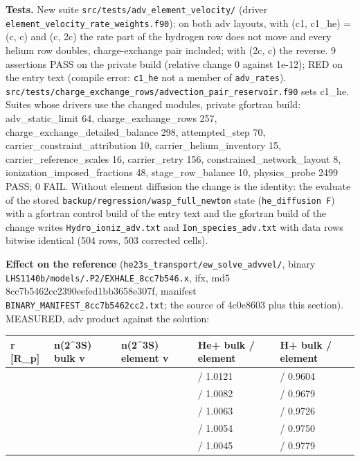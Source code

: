 \documentclass[english,a4paper]{my_memo}
\begin{document}
\textbf{Tests.} New suite \texttt{src/tests/adv\_element\_velocity/} (driver
\texttt{element\_velocity\_rate\_weights.f90}): on both adv layouts, with (c1, c1\_he) =
(c, c) and (c, 2c) the rate part of the hydrogen row does not move and every
helium row doubles, charge-exchange pair included; with (2c, c) the reverse.
9 assertions PASS on the private build (relative change 0 against 1e-12);
RED on the entry text (compile error: \texttt{c1\_he} not a member of \texttt{adv\_rates}).
\texttt{src/tests/charge\_exchange\_rows/advection\_pair\_reservoir.f90} sets c1\_he.
Suites whose drivers use the changed modules, private gfortran build:
adv\_static\_limit 64, charge\_exchange\_rows 257, charge\_exchange\_detailed\_balance
298, attempted\_step 70, carrier\_constraint\_attribution 10,
carrier\_helium\_inventory 15, carrier\_reference\_scales 16, carrier\_retry 156,
constrained\_network\_layout 8, ionization\_imposed\_fractions 48,
stage\_row\_balance 10, physics\_probe 2499 PASS; 0 FAIL.
Without element diffusion the change is the identity: the evaluate of the
stored \texttt{backup/regression/wasp\_full\_newton} state (\texttt{he\_diffusion\ F}) with a
gfortran control build of the entry text and the gfortran build of the
change writes \texttt{Hydro\_ioniz\_adv.txt} and \texttt{Ion\_species\_adv.txt} with data rows
bitwise identical (504 rows, 503 corrected cells).

\textbf{Effect on the reference} (\texttt{he23s\_transport/ew\_solve\_advvel/}, binary
\texttt{LHS1140b/models/.P2/EXHALE\_8cc7b546.x}, ifx, md5
8cc7b5462cc2390eefed1bb3658e307f, manifest
\texttt{BINARY\_MANIFEST\_8cc7b5462cc2.txt}; the source of 4c0e8603 plus this
section). MEASURED, adv product against the solution:

{\def\LTcaptype{none} %
{\small
\begin{longtable}[]{@{}>{\raggedright\arraybackslash}p{\dimexpr(\linewidth-10\tabcolsep)/5\relax}>{\raggedright\arraybackslash}p{\dimexpr(\linewidth-10\tabcolsep)/5\relax}>{\raggedright\arraybackslash}p{\dimexpr(\linewidth-10\tabcolsep)/5\relax}>{\raggedright\arraybackslash}p{\dimexpr(\linewidth-10\tabcolsep)/5\relax}>{\raggedright\arraybackslash}p{\dimexpr(\linewidth-10\tabcolsep)/5\relax}@{}}
\toprule\noalign{}
r {[}R\_p{]} & n(2\^{}3S) bulk v & n(2\^{}3S) element v & He+ bulk / element & H+ bulk / element \\
\midrule\noalign{}
\endhead
\bottomrule\noalign{}
\endlastfoot
2.00 & 0.9680 & 1.0122 & 0.9668 / 1.0121 & 1.0480 / 0.9604 \\
3.02 & 0.9635 & 1.0066 & 0.9629 / 1.0082 & 1.0615 / 0.9679 \\
4.98 & 0.9662 & 1.0028 & 0.9666 / 1.0063 & 1.0604 / 0.9726 \\
7.95 & 0.9686 & 1.0014 & 0.9698 / 1.0054 & 1.0576 / 0.9750 \\
20.10 & 0.9728 & 1.0009 & 0.9743 / 1.0045 & 1.0524 / 0.9779 \\
\end{longtable}
}
}
\end{document}
